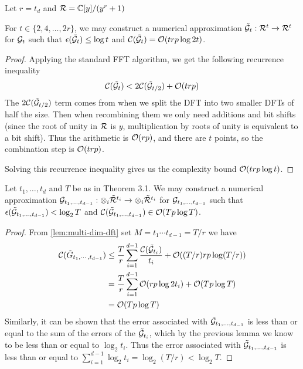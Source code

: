 Let $r = t_d$ and $\mathcal R = {\mathbb C}[y] / (y^r + 1)$

\begin{lemma}
    For $t \in \{2, 4, \ldots, 2r\}$, we may construct a numerical approximation $\tilde{\mathcal G}_t: \mathcal R^t \to \mathcal R^t$ for $\mathcal G_t$ such that $\epsilon (\tilde{\mathcal G}_t) \leq \log t$ and $\mathcal C(\tilde{\mathcal G}_t)= \mathcal O(trp \log 2t)$.
\end{lemma}

\begin{proof}
    Applying the standard FFT algorithm, we get the following recurrence inequality
    \[
        \mathcal C(\tilde{\mathcal G}_t) < 2 \mathcal C(\tilde{\mathcal G}_{t/2}) + \mathcal O(trp)
    \]
    The $2 \mathcal C(\tilde{\mathcal G}_{t/2})$ term comes from when we split the DFT into two smaller DFTs of half the size. Then when recombining them we only need additions and bit shifts (since the root of unity in $\mathcal R$ is $y$, multiplication by roots of unity is equivalent to a bit shift). Thus the arithmetic is $\mathcal O(rp)$, and there are $t$ points, so the combination step is $\mathcal O(trp)$.

    Solving this recurrence inequality gives us the complexity bound $\mathcal O(trp \log t)$.
\end{proof}

\begin{proposition}
    Let $t_1, \ldots, t_d$ and $T$ be as in Theorem 3.1. We may construct a numerical approximation $\mathcal G_{t_1, \ldots, t_{d-1}}: \otimes_i \tilde{\mathcal R}^{t_i} \to \otimes_i \tilde{\mathcal R}^{t_i}$ for $\mathcal G_{t_1, \ldots, t_{d-1}}$ such that $\epsilon(\tilde{\mathcal G}_{t_1, \ldots, t_{d-1}}) < \log_2 T$ and $\mathcal C(\tilde{\mathcal G}_{t_1, \ldots, t_{d-1}}) \in \mathcal O(Tp \log T)$.
\end{proposition}

\begin{proof}
    From \ref{lem:multi-dim-dft} set $M = t_1\cdots t_{d-1} = T/r$ we have
    \begin{align*}
        \mathcal C(\tilde{G}_{t_1, \cdots, t_{d-1}}) &\leq \frac{T}{r} \sum^{d-1}_{i=1} \frac{\mathcal C(\tilde{\mathcal G}_{t_i})}{t_i} + \mathcal O((T/r)rp\log (T / r))\\
                                                &= \frac{T}{r}\sum^{d-1}_{i=1}\mathcal O(rp\log 2t_i) + \mathcal O(Tp \log T)\\
                                                &= \mathcal O(Tp \log T)
    \end{align*}
    Similarly, it can be shown that the error associated with $\tilde{\mathcal G}_{t_1, \ldots, t_{d-1}}$ is less than or equal to the sum of the errors of the $\tilde{\mathcal G}_{t_i}$, which by the previous lemma we know to be less than or equal to $\log_2 t_i$. Thus the error associated with $\tilde{\mathcal G}_{t_1, \ldots, t_{d-1}}$ is less than or equal to $\sum^{d-1}_{i=1} \log_2 t_i = \log_2 (T/r) < \log_2 T$.
\end{proof}

